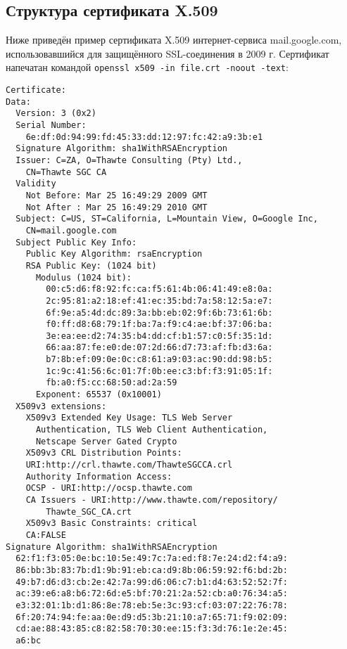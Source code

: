 \subsection{Структура сертификата X.509}

Ниже приведён пример сертификата X.509 интернет-сервиса mail.google.com, использовавшийся для защищённого SSL-соединения в 2009 г. Сертификат напечатан командой \texttt{openssl x509 -in file.crt -noout -text}:

{\small \begin{verbatim}
Certificate:
Data:
  Version: 3 (0x2)
  Serial Number:
    6e:df:0d:94:99:fd:45:33:dd:12:97:fc:42:a9:3b:e1
  Signature Algorithm: sha1WithRSAEncryption
  Issuer: C=ZA, O=Thawte Consulting (Pty) Ltd.,
    CN=Thawte SGC CA
  Validity
    Not Before: Mar 25 16:49:29 2009 GMT
    Not After : Mar 25 16:49:29 2010 GMT
  Subject: C=US, ST=California, L=Mountain View, O=Google Inc,
    CN=mail.google.com
  Subject Public Key Info:
    Public Key Algorithm: rsaEncryption
    RSA Public Key: (1024 bit)
      Modulus (1024 bit):
        00:c5:d6:f8:92:fc:ca:f5:61:4b:06:41:49:e8:0a:
        2c:95:81:a2:18:ef:41:ec:35:bd:7a:58:12:5a:e7:
        6f:9e:a5:4d:dc:89:3a:bb:eb:02:9f:6b:73:61:6b:
        f0:ff:d8:68:79:1f:ba:7a:f9:c4:ae:bf:37:06:ba:
        3e:ea:ee:d2:74:35:b4:dd:cf:b1:57:c0:5f:35:1d:
        66:aa:87:fe:e0:de:07:2d:66:d7:73:af:fb:d3:6a:
        b7:8b:ef:09:0e:0c:c8:61:a9:03:ac:90:dd:98:b5:
        1c:9c:41:56:6c:01:7f:0b:ee:c3:bf:f3:91:05:1f:
        fb:a0:f5:cc:68:50:ad:2a:59
      Exponent: 65537 (0x10001)
  X509v3 extensions:
    X509v3 Extended Key Usage: TLS Web Server
      Authentication, TLS Web Client Authentication,
      Netscape Server Gated Crypto
    X509v3 CRL Distribution Points:
    URI:http://crl.thawte.com/ThawteSGCCA.crl
    Authority Information Access:
    OCSP - URI:http://ocsp.thawte.com
    CA Issuers - URI:http://www.thawte.com/repository/
        Thawte_SGC_CA.crt
    X509v3 Basic Constraints: critical
    CA:FALSE
Signature Algorithm: sha1WithRSAEncryption
  62:f1:f3:05:0e:bc:10:5e:49:7c:7a:ed:f8:7e:24:d2:f4:a9:
  86:bb:3b:83:7b:d1:9b:91:eb:ca:d9:8b:06:59:92:f6:bd:2b:
  49:b7:d6:d3:cb:2e:42:7a:99:d6:06:c7:b1:d4:63:52:52:7f:
  ac:39:e6:a8:b6:72:6d:e5:bf:70:21:2a:52:cb:a0:76:34:a5:
  e3:32:01:1b:d1:86:8e:78:eb:5e:3c:93:cf:03:07:22:76:78:
  6f:20:74:94:fe:aa:0e:d9:d5:3b:21:10:a7:65:71:f9:02:09:
  cd:ae:88:43:85:c8:82:58:70:30:ee:15:f3:3d:76:1e:2e:45:
  a6:bc
\end{verbatim}}

